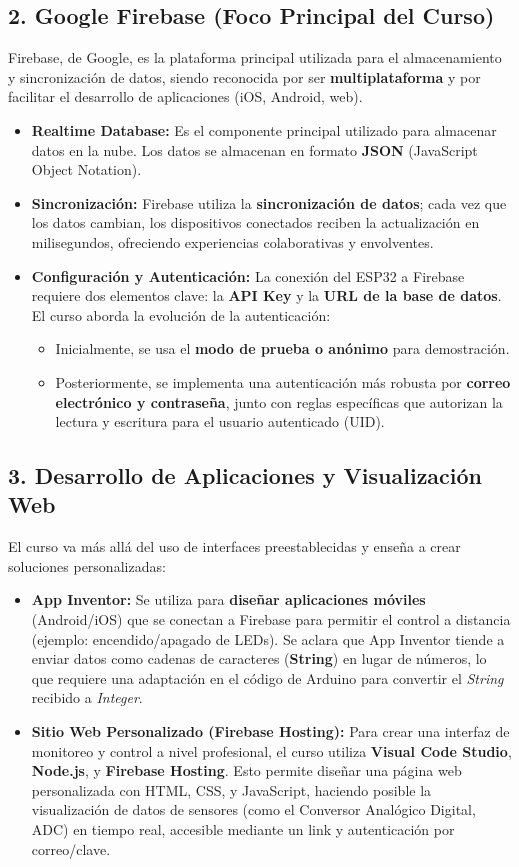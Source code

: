 \documentclass{article}
\begin{document}
\subsection*{2. Google Firebase (Foco Principal del Curso)}
Firebase, de Google, es la plataforma principal utilizada para el almacenamiento y sincronización de datos, siendo reconocida por ser \textbf{multiplataforma} y por facilitar el desarrollo de aplicaciones (iOS, Android, web).
\begin{itemize}
    \item \textbf{Realtime Database:} Es el componente principal utilizado para almacenar datos en la nube. Los datos se almacenan en formato \textbf{JSON} (JavaScript Object Notation).
    \item \textbf{Sincronización:} Firebase utiliza la \textbf{sincronización de datos}; cada vez que los datos cambian, los dispositivos conectados reciben la actualización en milisegundos, ofreciendo experiencias colaborativas y envolventes.
    \item \textbf{Configuración y Autenticación:} La conexión del ESP32 a Firebase requiere dos elementos clave: la \textbf{API Key} y la \textbf{URL de la base de datos}. El curso aborda la evolución de la autenticación:
        \begin{itemize}
            \item Inicialmente, se usa el \textbf{modo de prueba o anónimo} para demostración.
            \item Posteriormente, se implementa una autenticación más robusta por \textbf{correo electrónico y contraseña}, junto con reglas específicas que autorizan la lectura y escritura para el usuario autenticado (UID).
        \end{itemize}
\end{itemize}

\subsection*{3. Desarrollo de Aplicaciones y Visualización Web}
El curso va más allá del uso de interfaces preestablecidas y enseña a crear soluciones personalizadas:
\begin{itemize}
    \item \textbf{App Inventor:} Se utiliza para \textbf{diseñar aplicaciones móviles} (Android/iOS) que se conectan a Firebase para permitir el control a distancia (ejemplo: encendido/apagado de LEDs). Se aclara que App Inventor tiende a enviar datos como cadenas de caracteres (\textbf{String}) en lugar de números, lo que requiere una adaptación en el código de Arduino para convertir el \textit{String} recibido a \textit{Integer}.
    \item \textbf{Sitio Web Personalizado (Firebase Hosting):} Para crear una interfaz de monitoreo y control a nivel profesional, el curso utiliza \textbf{Visual Code Studio}, \textbf{Node.js}, y \textbf{Firebase Hosting}. Esto permite diseñar una página web personalizada con HTML, CSS, y JavaScript, haciendo posible la visualización de datos de sensores (como el Conversor Analógico Digital, ADC) en tiempo real, accesible mediante un link y autenticación por correo/clave.
\end{itemize}
\end{document}
